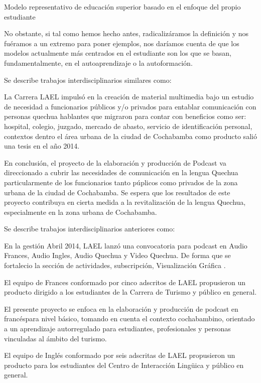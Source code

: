 Modelo representativo de educaci\'{o}n superior basado en el enfoque del propio estudiante

No obstante, si tal como hemos hecho antes, radicaliz\'{a}ramos la definici\'{o}n y nos fu\'{e}ramos a un extremo para poner
ejemplos, nos dar\'{i}amos cuenta de que los modelos actualmente m\'{a}s centrados en el estudiante son los que se basan, 
fundamentalmente, en el autoaprendizaje o la autoformaci\'{o}n.\cite{duart2000aprender}

Se describe trabajos interdisciplinarios similares como: 

La Carrera LAEL impuls\'{o} en la creaci\'{o}n de material multimedia bajo un estudio de necesidad a funcionarios 
públicos y/o privados para entablar comunicaci\'{o}n con personas quechua hablantes que migraron para contar con
beneficios como ser: hospital, colegio, juzgado, mercado de abasto, servicio de identificación personal, 
contextos dentro el área urbana de la ciudad de Cochabamba como producto salió una tesis en el año 2014.

En conclusi\'{o}n, el proyecto de la elaboraci\'{o}n y producci\'{o}n de Podcast va direccionado a cubrir
las necesidades de comunicaci\'{o}n en la lengua Quechua particularmente de los funcionarios tanto p\'{u}plicos
como privados de la zona urbana de la ciudad de Cochabamba. Se espera que los resultados de este proyecto contribuya
en cierta medida a la revitalizaci\'{o}n de la lengua Quechua, especialmente en la zona urbana de Cochabamba.\cite{CHLMV2014}

Se describe trabajos interdisciplinarios anteriores como:

En la gesti\'{o}n Abril 2014, LAEL lanz\'{o} una convocatoria para podcast en Audio Frances, Audio Ingles, Audio Quechua y 
Video Quechua. De forma que se fortalecio la secci\'{o}n de actividades, subscripci\'{o}n, Visualizaci\'{o}n Gr\'{a}fica .

El equipo de Frances conformado por cinco adscritos de LAEL propusieron un producto dirigido a los estudiantes de la 
Carrera de Turismo y público en general.

El presente proyecto se enfoca en la elaboraci\'{o}n y producci\'{o}n de podcast en franc\'{e}spara nivel b\'{a}sico,
tomando en cuenta el contexto cochabambino, orientado a un aprendizaje autorregulado para estudiantes, profesionales y
personas vinculadas al \'{a}mbito del turismo. \cite{CMNPZ2015}

El equipo de Ingl\'{e}s conformado por seis adscritas de LAEL propusieron un producto para los estudiantes del
Centro de Interacci\'{o}n Ling\"{u}ica y p\'{u}blico en general.

